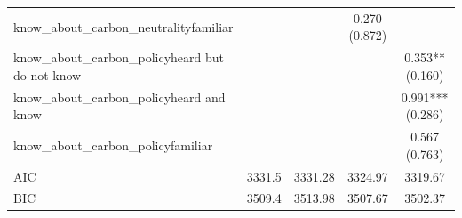 \begin{table}[!htbp]
\begin{tabular}{lcccc}
know\_about\_carbon\_neutralityfamiliar &  &  & 0.270 (0.872) &  \\
know\_about\_carbon\_policyheard but do not know &  &  &  & 0.353** (0.160) \\
know\_about\_carbon\_policyheard and know &  &  &  & 0.991*** (0.286) \\
know\_about\_carbon\_policyfamiliar &  &  &  & 0.567 (0.763) \\
AIC & 3331.5 & 3331.28 & 3324.97 & 3319.67 \\
BIC & 3509.4 & 3513.98 & 3507.67 & 3502.37 \\
\hline
\end{tabular}
\end{table}
